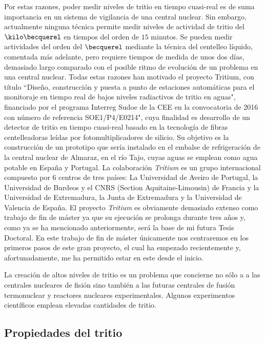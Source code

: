 Por estas razones, poder medir niveles de tritio en tiempo cuasi-real es de suma importancia en un sistema de vigilancia de una central nuclear. Sin embargo, actualmente ninguna técnica permite medir niveles de actividad de tritio del $\kilo\becquerel$ en tiempos del orden de $15$ minutos.   Se pueden medir actividades  del orden del $\becquerel$  mediante la técnica del centelleo líquido, comentada más adelante, pero requiere tiempos de medida de unos dos días, demasiado largo comparado con el posible ritmo de evolución de un problema en una central nuclear.   Todas estas razones han motivado el proyecto Tritium, con título ``Diseño, construcción y puesta a punto de estaciones automáticas para el monitoraje en tiempo real de bajos niveles radiactivos de tritio en aguas",  financiado por el programa Interreg Sudoe de la CEE en la convocatoria de 2016 con número de referencia  SOE1/P4/E0214", cuya finalidad es desarrollo de un detector de tritio en tiempo cuasi-real basado en la tecnología de fibras centelleadoras leídas por fotomultiplicadores de silicio. Su objetivo es la construcción de un prototipo que sería instalado en el embalse de refrigeración de la central nuclear de Almaraz, en el río Tajo, cuyas aguas se emplean como agua potable en España y Portugal.
La colaboración \textit{Tritium} es un grupo internacional compuesto por 6 centros de tres países:  La Universidad de Aveiro de Portugal,  la Universidad de Burdeos y el CNRS (Section Aquitaine-Limousin)  de Francia y  la Universidad de Extremadura, la Junta de Extremadura y la Universidad de Valencia de España. El proyecto \textit{Tritium} es  obviamente demasiado extenso como trabajo de fin de máster ya que  su ejecución se prolonga durante tres  años  y, como ya se ha mencionado anteriormente, será la base de mi futura Tesis Doctoral. En este trabajo de fin de máster únicamente nos centraremos en los primeros pasos de este gran proyecto, el cual ha empezado recientemente y, afortunadamente, me ha permitido estar en este desde el inicio.









La creación de altos niveles de tritio es un problema que concierne no sólo a  a las  centrales nucleares de fisión sino también a las  futuras centrales de fusión termonuclear y reactores nucleares experimentales. Algunos experimentos científicos emplean elevadas cantidades de tritio.

\subsection{Propiedades del tritio}

